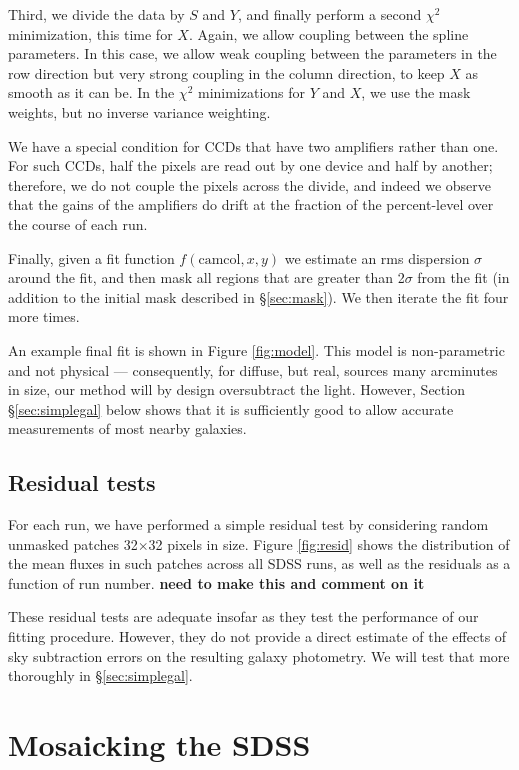 \documentclass[10pt,preprint]{aastex}
\begin{document}
Third, we divide the data by $S$ and $Y$, and finally perform a second
$\chi^2$ minimization, this time for $X$. Again, we allow coupling
between the spline parameters.  In this case, we allow weak coupling
between the parameters in the row direction but very strong coupling
in the column direction, to keep $X$ as smooth as it can be. In the
$\chi^2$ minimizations for $Y$ and $X$, we use the mask weights, but
no inverse variance weighting.

We have a special condition for CCDs that have two amplifiers rather
than one. For such CCDs, half the pixels are read out by one device
and half by another; therefore, we do not couple the pixels across the
divide, and indeed we observe that the gains of the amplifiers do
drift at the fraction of the percent-level over the course of each
run.

Finally, given a fit function $f(\mathrm{camcol}, x, y)$ we estimate
an rms dispersion $\sigma$ around the fit, and then mask all regions
that are greater than 2$\sigma$ from the fit (in addition to the
initial mask described in \S\ref{sec:mask}). We then iterate the fit
four more times.

An example final fit is shown in Figure \ref{fig:model}. This model is
non-parametric and not physical --- consequently, for diffuse, but
real, sources many arcminutes in size, our method will by design
oversubtract the light.  However, Section
\S\ref{sec:simplegal} below shows that it is sufficiently good to
allow accurate measurements of most nearby galaxies.

\subsection{Residual tests}
\label{sec:residuals}

For each run, we have performed a simple residual test by considering
random unmasked patches 32$\times$32 pixels in size. Figure
\ref{fig:resid} shows the distribution of the mean fluxes in such
patches across all SDSS runs, as well as the residuals as a function
of run number.  {\bf need to make this and comment on it}

These residual tests are adequate insofar as they test the performance
of our fitting procedure.  However, they do not provide a direct
estimate of the effects of sky subtraction errors on the resulting
galaxy photometry.  We will test that more thoroughly in
\S\ref{sec:simplegal}.

\section{Mosaicking the SDSS}
\label{sec:mosaic}
\end{document}
